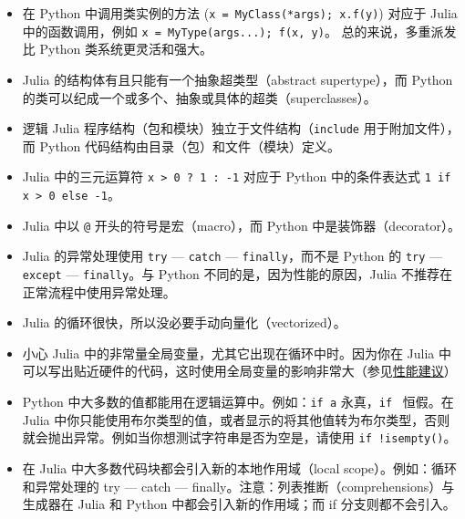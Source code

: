\begin{itemize}
\item 在 Python 中调用类实例的方法 (\texttt{x = MyClass(*args); x.f(y)}) 对应于 Julia 中的函数调用，例如 \texttt{x = MyType(args...); f(x, y)}。 总的来说，多重派发比 Python 类系统更灵活和强大。


\item Julia 的结构体有且只能有一个抽象超类型（abstract supertype），而 Python 的类可以纪成一个或多个、抽象或具体的超类（superclasses）。


\item 逻辑 Julia 程序结构（包和模块）独立于文件结构（\texttt{include} 用于附加文件），而 Python 代码结构由目录（包）和文件（模块）定义。


\item Julia 中的三元运算符 \texttt{x > 0 ? 1 :  -1} 对应于 Python 中的条件表达式 \texttt{1 if x > 0 else -1}。


\item Julia 中以 \texttt{@} 开头的符号是宏（macro），而 Python 中是装饰器（decorator）。


\item Julia 的异常处理使用 \texttt{try} — \texttt{catch} — \texttt{finally}，而不是 Python 的 \texttt{try} — \texttt{except} — \texttt{finally}。与 Python 不同的是，因为性能的原因，Julia 不推荐在正常流程中使用异常处理。


\item Julia 的循环很快，所以没必要手动向量化（vectorized）。


\item 小心 Julia 中的非常量全局变量，尤其它出现在循环中时。因为你在 Julia 中可以写出贴近硬件的代码，这时使用全局变量的影响非常大（参见\hyperlink{818954303942149020}{性能建议}）


\item Python 中大多数的值都能用在逻辑运算中。例如：\texttt{if {\textquotedbl}a{\textquotedbl}} 永真，\texttt{if {\textquotedbl}{\textquotedbl}} 恒假。在 Julia 中你只能使用布尔类型的值，或者显示的将其他值转为布尔类型，否则就会抛出异常。例如当你想测试字符串是否为空是，请使用 \texttt{if !isempty({\textquotedbl}{\textquotedbl})}。


\item 在 Julia 中大多数代码块都会引入新的本地作用域（local scope）。例如：循环和异常处理的 try — catch — finally。注意：列表推断（comprehensions）与生成器在 Julia 和 Python 中都会引入新的作用域；而 if 分支则都不会引入。

\end{itemize}


